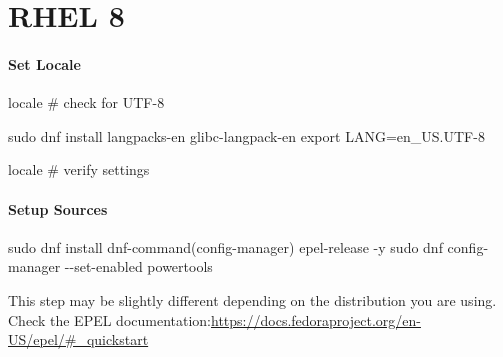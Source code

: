 \documentclass[
  letterpaper,
  DIV=11,
  numbers=noendperiod]{scrreprt}
\newenvironment{Shaded}{\begin{snugshade}}{\end{snugshade}}
\newcommand{\AttributeTok}[1]{\textcolor[rgb]{0.40,0.45,0.13}{#1}}
\newcommand{\BuiltInTok}[1]{\textcolor[rgb]{0.00,0.23,0.31}{#1}}
\newcommand{\CommentTok}[1]{\textcolor[rgb]{0.37,0.37,0.37}{#1}}
\newcommand{\ExtensionTok}[1]{\textcolor[rgb]{0.00,0.23,0.31}{#1}}
\newcommand{\FunctionTok}[1]{\textcolor[rgb]{0.28,0.35,0.67}{#1}}
\newcommand{\NormalTok}[1]{\textcolor[rgb]{0.00,0.23,0.31}{#1}}
\newcommand{\OperatorTok}[1]{\textcolor[rgb]{0.37,0.37,0.37}{#1}}
\newcommand{\StringTok}[1]{\textcolor[rgb]{0.13,0.47,0.30}{#1}}
\newcommand{\VariableTok}[1]{\textcolor[rgb]{0.07,0.07,0.07}{#1}}
\begin{document}

\hypertarget{sec-rhel-8}{%
\chapter{RHEL 8}\label{sec-rhel-8}}

\hypertarget{set-locale-1}{%
\subsubsection{Set Locale}\label{set-locale-1}}

\begin{Shaded}
\begin{Highlighting}[]
\ExtensionTok{locale}  \CommentTok{\# check for UTF{-}8}

\FunctionTok{sudo}\NormalTok{ dnf install langpacks{-}en glibc{-}langpack{-}en}
\BuiltInTok{export} \VariableTok{LANG}\OperatorTok{=}\NormalTok{en\_US.UTF{-}8}

\ExtensionTok{locale}  \CommentTok{\# verify settings}
\end{Highlighting}
\end{Shaded}

\hypertarget{setup-sources-1}{%
\subsubsection{Setup Sources}\label{setup-sources-1}}

\begin{Shaded}
\begin{Highlighting}[]
\FunctionTok{sudo}\NormalTok{ dnf install }\StringTok{\textquotesingle{}dnf{-}command(config{-}manager)\textquotesingle{}}\NormalTok{ epel{-}release }\AttributeTok{{-}y}
\FunctionTok{sudo}\NormalTok{ dnf config{-}manager }\AttributeTok{{-}{-}set{-}enabled}\NormalTok{ powertools}
\end{Highlighting}
\end{Shaded}

\begin{tcolorbox}[enhanced jigsaw, coltitle=black, breakable, title=\textcolor{quarto-callout-note-color}{\faInfo}\hspace{0.5em}{Note}, toprule=.15mm, leftrule=.75mm, colframe=quarto-callout-note-color-frame, colbacktitle=quarto-callout-note-color!10!white, opacitybacktitle=0.6, left=2mm, colback=white, toptitle=1mm, bottomtitle=1mm, titlerule=0mm, arc=.35mm, rightrule=.15mm, opacityback=0, bottomrule=.15mm]

This step may be slightly different depending on the distribution you
are using. Check the EPEL
documentation:\url{https://docs.fedoraproject.org/en-US/epel/\#_quickstart}

\end{tcolorbox}
\end{document}
